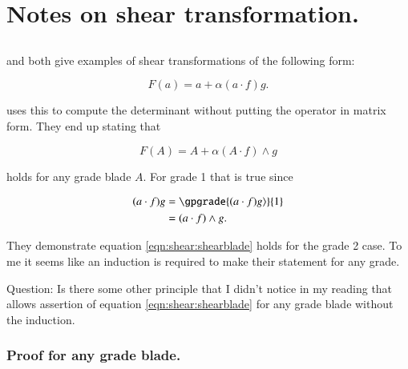 
%





\chapter{Notes on shear transformation. }
\label{chap:shear}
\date{ April 7, 2008.  $RCSfile: shear.tex,v $ Last $Revision: 1.10 $ $Date: 2009/06/14 23:51:45 $ }

%


\section{}

\citep{dorst2007gac} and \citep{doran2003gap}
both give examples of shear transformations of the following
form:

\[
F(a) = a + \alpha(a \cdot f) g.
\]

\citep{doran2003gap}
uses this to compute the determinant without putting the operator in matrix form.  They end up stating that 

\begin{equation}\label{eqn:shear:shearblade}
F(A) = A + \alpha (A \cdot f) \wedge g
\end{equation}

holds for any grade blade $A$.  For grade 1 that is true since

\begin{align*}
(a \cdot f) g 
&= \gpgrade{(a \cdot f) g \rangle}{1} \\
&= (a \cdot f) \wedge g.
\end{align*}

They demonstrate equation \ref{eqn:shear:shearblade}
holds for the grade 2 case.  To me it seems
like an induction is required to make their statement for any grade.

Question: Is there some other principle that I didn't notice in my reading that allows assertion of 
equation \ref{eqn:shear:shearblade}
for any grade blade without the induction.

\subsection{Proof for any grade blade. }

